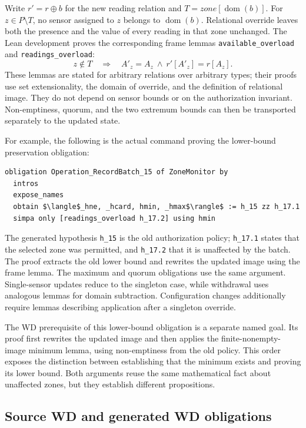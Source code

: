 Write $r'=r\mathbin{\oplus}b$ for the new reading relation and
$T=\mathit{zone}[\operatorname{dom}(b)]$. For $z\in P\setminus T$, no
sensor assigned to $z$ belongs to $\operatorname{dom}(b)$. Relational
override leaves both the presence and the value of every reading in that
zone unchanged. The Lean development proves the corresponding frame
lemmas \texttt{available\_overload} and \texttt{readings\_overload}:
\[
  z\notin T\quad\Longrightarrow\quad
  A'_z=A_z\ \land\ r'[A'_z]=r[A_z].
\]
These lemmas are stated for arbitrary relations over arbitrary types;
their proofs use set extensionality, the domain of override, and the
definition of relational image. They do not depend on sensor bounds or
on the authorization invariant. Non-emptiness, quorum, and the two
extremum bounds can then be transported separately to the updated state.

For example, the following is the actual \barrel command proving the
lower-bound preservation obligation:
\begin{lstlisting}[mathescape=true]
obligation Operation_RecordBatch_15 of ZoneMonitor by
  intros
  expose_names
  obtain $\langle$_hne, _hcard, hmin, _hmax$\rangle$ := h_15 zz h_17.1
  simpa only [readings_overload h_17.2] using hmin
\end{lstlisting}
The generated hypothesis \texttt{h\_15} is the old authorization policy;
\texttt{h\_17.1} states that the selected zone was permitted, and
\texttt{h\_17.2} that it is unaffected by the batch. The proof extracts
the old lower bound and rewrites the updated image using the frame lemma.
The maximum and quorum obligations use the same argument. Single-sensor
updates reduce to the singleton case, while withdrawal uses analogous
lemmas for domain subtraction. Configuration changes additionally require
lemmas describing application after a singleton override.

The WD prerequisite of this lower-bound obligation is a separate named
goal. Its proof first rewrites the updated image and then applies the
finite-nonempty-image minimum lemma, using non-emptiness from the old
policy. This order exposes the distinction between establishing that the
minimum exists and proving its lower bound. Both arguments reuse the same
mathematical fact about unaffected zones, but they establish different
propositions.

\subsection{Source WD and generated WD obligations}

